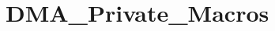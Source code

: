 \hypertarget{group___d_m_a___private___macros}{\section{D\-M\-A\-\_\-\-Private\-\_\-\-Macros}
\label{group___d_m_a___private___macros}
}
